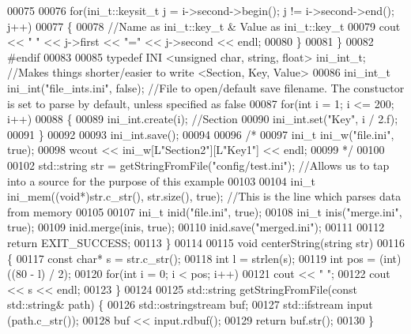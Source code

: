 \begin{DoxyCode}
00075 
00076       \textcolor{keywordflow}{for}(ini\_t::keysit\_t j = i->second->begin(); j != i->second->end(); j++)
00077       \{
00078          \textcolor{comment}{//Name as ini\_t::key\_t & Value as ini\_t::key\_t}
00079          cout << \textcolor{stringliteral}{" "} << j->first << \textcolor{stringliteral}{"="} << j->second << endl;
00080       \}
00081    \}
00082 \textcolor{preprocessor}{#endif}
00083 
00085    \textcolor{keyword}{typedef} INI <unsigned char, string, float> ini\_int\_t;  \textcolor{comment}{//Makes things shorter/easier to write <Section,
       Key, Value>}
00086    ini\_int\_t ini\_int(\textcolor{stringliteral}{"file\_ints.ini"}, \textcolor{keyword}{false});  \textcolor{comment}{//File to open/default save filename. The constuctor is set
       to parse by default, unless specified as false}
00087    \textcolor{keywordflow}{for}(\textcolor{keywordtype}{int} i = 1; i <= 200; i++)
00088    \{
00089       ini\_int.create(i); \textcolor{comment}{//Section}
00090       ini\_int.set(\textcolor{stringliteral}{"Key"}, i / 2.f);
00091    \}
00092 
00093    ini\_int.save();
00094 
00096    \textcolor{comment}{/*}
00097 \textcolor{comment}{   ini\_t ini\_w("file.ini", true);}
00098 \textcolor{comment}{   wcout << ini\_w[L"Section2"][L"Key1"] << endl;}
00099 \textcolor{comment}{   */}
00100 
00102    std::string str = getStringFromFile(\textcolor{stringliteral}{"config/test.ini"}); \textcolor{comment}{//Allows us to tap into a source for the purpose
       of this example}
00103 
00104    ini\_t ini\_mem((\textcolor{keywordtype}{void}*)str.c\_str(), str.size(), \textcolor{keyword}{true}); \textcolor{comment}{//This is the line which parses data from memory}
00105 
00107    ini\_t inid(\textcolor{stringliteral}{"file.ini"}, \textcolor{keyword}{true});
00108    ini\_t inis(\textcolor{stringliteral}{"merge.ini"}, \textcolor{keyword}{true});
00109    inid.merge(inis, \textcolor{keyword}{true});
00110    inid.save(\textcolor{stringliteral}{"merged.ini"});
00111 
00112    \textcolor{keywordflow}{return} EXIT\_SUCCESS;
00113 \}
00114 
00115 \textcolor{keywordtype}{void} centerString(\textcolor{keywordtype}{string} str)
00116 \{
00117    \textcolor{keyword}{const} \textcolor{keywordtype}{char}* s = str.c\_str();
00118    \textcolor{keywordtype}{int} l = strlen(s);
00119    \textcolor{keywordtype}{int} pos = (int)((80 - l) / 2);
00120    \textcolor{keywordflow}{for}(\textcolor{keywordtype}{int} i = 0; i < pos; i++)
00121    cout << \textcolor{stringliteral}{" "};
00122    cout << s << endl;
00123 \}
00124 
00125 std::string getStringFromFile(\textcolor{keyword}{const} std::string& path) \{
00126   std::ostringstream buf;
00127   std::ifstream input (path.c\_str());
00128   buf << input.rdbuf();
00129   \textcolor{keywordflow}{return} buf.str();
00130 \}
\end{DoxyCode}
